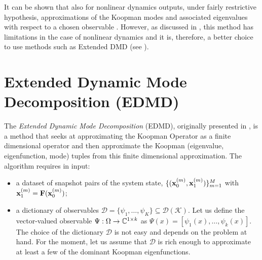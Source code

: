 It can be shown that also for nonlinear dynamics  outputs, under fairly restrictive hypothesis, approximations of the Koopman modes and associated eigenvalues with respect to a chosen observable \cite{rowley_spectral_2009, tu_dynamic_2014}. However, as discussed in \cite{tu_dynamic_2014}, this method has limitations in the case of nonlinear dynamics and it is, therefore, a better choice to use methods such as Extended DMD \cite{williams_data-driven_2015} (see ).

\section{Extended Dynamic Mode Decomposition (EDMD)}
\label{section_edmd}
The \emph{Extended Dynamic Mode Decomposition} (EDMD), originally presented in \cite{williams_data-driven_2015}, is a method that seeks at approximating the Koopman Operator as a finite dimensional operator and then approximate the Koopman (eigenvalue, eigenfunction, mode) tuples from this finite dimensional approximation. The algorithm requires in input:
\begin{itemize}
    \item a dataset of snapshot pairs of the system state, $\{(\vb{x}_0^{(m)}, \vb{x}_1^{(m)})\}_{m = 1}^M$ with $\vb{x}_1^{(m)} = \vb{F}(\vb{x}_0^{(m)})$;
    \item a dictionary of observables $\mathcal{D} = \{\psi_1, \dots, \psi_K\} \subseteq \mathcal{D}(\mathcal{K})$. Let us define the vector-valued observable $\Psi:\Omega\to\mathbb{C}^{1\times k}$ as $\Psi(x) = [\psi_1(x), \dots, \psi_k(x)]$. The choice of the dictionary $\mathcal{D}$ is not easy and depends on the problem at hand. For the moment, let us assume that $\mathcal{D}$ is rich enough to approximate at least a few of the dominant Koopman eigenfunctions.
\end{itemize}

